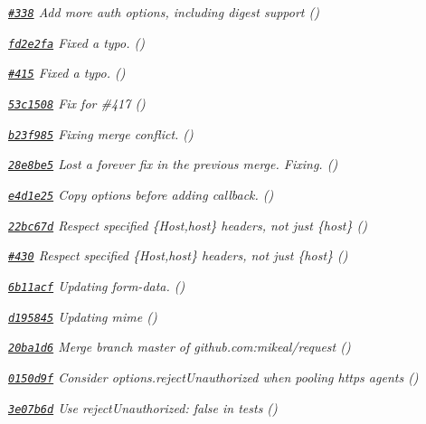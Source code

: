 \begin{DoxyItemize}
\item {\itshape \href{https://github.com/mikeal/request/pull/338}{\tt \#338} Add more auth options, including digest support ()}
\item {\itshape \href{https://github.com/mikeal/request/commit/fd2e2fa1e6d580cbc34afd3ae1200682cecb3cf9}{\tt fd2e2fa} Fixed a typo. ()}
\item {\itshape \href{https://github.com/mikeal/request/pull/415}{\tt \#415} Fixed a typo. ()}
\item {\itshape \href{https://github.com/mikeal/request/commit/53c1508c9c6a58f7d846de82cad36402497a4a4f}{\tt 53c1508} Fix for \#417 ()}
\item {\itshape \href{https://github.com/mikeal/request/commit/b23f985e02da4a96f1369541a128c4204a355666}{\tt b23f985} Fixing merge conflict. ()}
\item {\itshape \href{https://github.com/mikeal/request/commit/28e8be5175793ac99236df88e26c0139a143e32d}{\tt 28e8be5} Lost a forever fix in the previous merge. Fixing. ()}
\item {\itshape \href{https://github.com/mikeal/request/commit/e4d1e25c1648ef91f6baf1ef407c712509af4b66}{\tt e4d1e25} Copy options before adding callback. ()}
\item {\itshape \href{https://github.com/mikeal/request/commit/22bc67d7ac739e9c9f74c026f875a0a7c686e29d}{\tt 22bc67d} Respect specified \{Host,host\} headers, not just \{host\} ()}
\item {\itshape \href{https://github.com/mikeal/request/pull/430}{\tt \#430} Respect specified \{Host,host\} headers, not just \{host\} ()}
\item {\itshape \href{https://github.com/mikeal/request/commit/6b11acf3e29fb84daef4e940314cae5ac2e580c6}{\tt 6b11acf} Updating form-\/data. ()}
\item {\itshape \href{https://github.com/mikeal/request/commit/d195845c3e1de42c9aee752eec8efa4dda87ec74}{\tt d195845} Updating mime ()}
\item {\itshape \href{https://github.com/mikeal/request/commit/20ba1d6d38191aa7545b927a7262a18c5c63575b}{\tt 20ba1d6} Merge branch \textquotesingle{}master\textquotesingle{} of github.\+com\+:mikeal/request ()}
\item {\itshape \href{https://github.com/mikeal/request/commit/0150d9fa13e51d99880013b9ec29343850b40c2f}{\tt 0150d9f} Consider {\ttfamily options.\+reject\+Unauthorized} when pooling https agents ()}
\item {\itshape \href{https://github.com/mikeal/request/commit/3e07b6d4b81037d0e6e595670db483708ffa8698}{\tt 3e07b6d} Use {\ttfamily reject\+Unauthorized\+: false} in tests ()}

\end{DoxyItemize}
